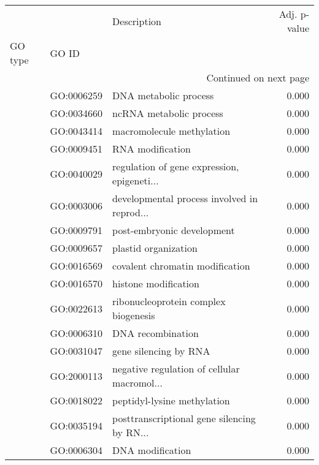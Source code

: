 \begin{longtable}{lllr}
\toprule
   &            &                                  Description &  Adj. p-value \\
GO type & GO ID &                                              &               \\
\midrule
\endhead
\midrule
\multicolumn{4}{r}{{Continued on next page}} \\
\midrule
\endfoot

\bottomrule
\endlastfoot
\multirow{248}{*}{BP} & GO:0006259 &                        DNA metabolic process &         0.000 \\
   & GO:0034660 &                      ncRNA metabolic process &         0.000 \\
   & GO:0043414 &                    macromolecule methylation &         0.000 \\
   & GO:0009451 &                             RNA modification &         0.000 \\
   & GO:0040029 &  regulation of gene expression, epigeneti... &         0.000 \\
   & GO:0003006 &  developmental process involved in reprod... &         0.000 \\
   & GO:0009791 &                   post-embryonic development &         0.000 \\
   & GO:0009657 &                         plastid organization &         0.000 \\
   & GO:0016569 &              covalent chromatin modification &         0.000 \\
   & GO:0016570 &                         histone modification &         0.000 \\
   & GO:0022613 &         ribonucleoprotein complex biogenesis &         0.000 \\
   & GO:0006310 &                            DNA recombination &         0.000 \\
   & GO:0031047 &                        gene silencing by RNA &         0.000 \\
   & GO:2000113 &  negative regulation of cellular macromol... &         0.000 \\
   & GO:0018022 &                  peptidyl-lysine methylation &         0.000 \\
   & GO:0035194 &  posttranscriptional gene silencing by RN... &         0.000 \\
   & GO:0006304 &                             DNA modification &         0.000 \\

\end{longtable}
